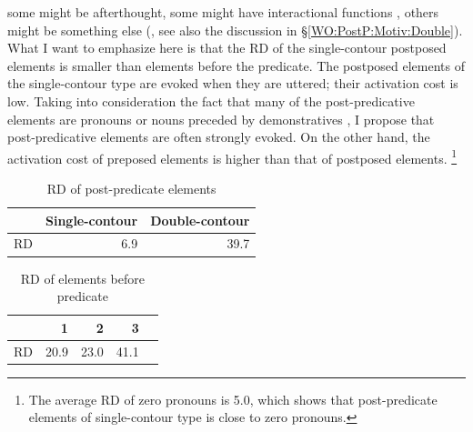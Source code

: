 some might be afterthought,
some might have interactional functions \cite{ono07},
others might be something else (, see also the discussion in \S \ref{WO:PostP:Motiv:Double}).
What I want to emphasize here is that the RD of the single-contour postposed elements is smaller than elements before the predicate.
The postposed elements of the single-contour type are evoked when they are uttered;
their activation cost is low.
Taking into consideration the fact that
many of the post-predicative elements are pronouns or nouns preceded by demonstratives \cite{nakagawaetal08_paper},
I propose that post-predicative elements are often strongly evoked.
On the other hand, the activation cost of preposed elements is higher than that of postposed elements.%
 \footnote{
 The average RD of zero pronouns is 5.0,
 which shows that post-predicate elements of single-contour type is
 close to zero pronouns.
 }

\begin{table}
 \centering
 \caption{RD of post-predicate elements}
 \begin{tabular}{lrr}
 \toprule
   & Single-contour & Double-contour \\
 \midrule
  RD & 6.9 & 39.7 \\
 \bottomrule
 \end{tabular}
 \label{RDPostT}
\end{table}
\begin{table}
  \centering
 \caption{RD of elements before predicate}
 \begin{tabular}{lrrrr}
 \toprule
  &  1  & 2 & 3 \\
 \midrule
 RD & 20.9 & 23.0 & 41.1 \\
 \bottomrule
 \end{tabular}
 \label{RDPreT}
\end{table}

